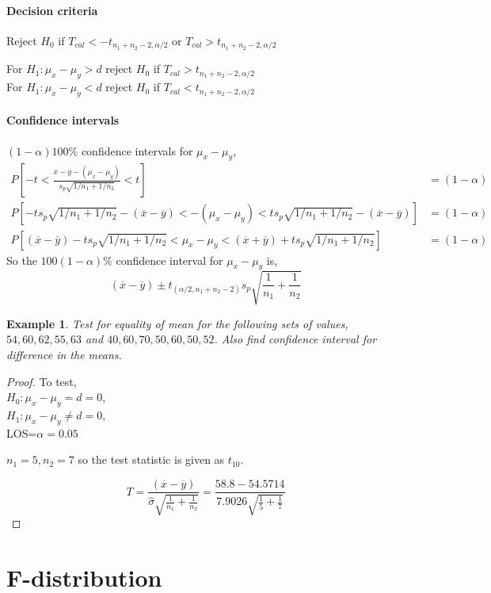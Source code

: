 \documentclass[oneside,11pt,pdftex]{book}%
\numberwithin{equation}{section}
\newtheorem{example}[theorem]{Example}
\numberwithin{section}{chapter}
\numberwithin{equation}{chapter}
\begin{document}
\subsubsection{Decision criteria}
Reject $ H_0 $ if $ T_{cal} < -t_{n_1+n_2-2,\alpha/2}$ or $ T_{cal}>t_{n_1+n_2-2,\alpha/2} $


For $ H_1: \mu_x-\mu_y>d $ reject $ H_0 $ if $ T_{cal} >t_{n_1+n_2-2,\alpha/2}$\\
For $ H_1: \mu_x-\mu_y<d $ reject $ H_0 $ if $ T_{cal} <t_{n_1+n_2-2,\alpha/2}$

\subsubsection{Confidence intervals}
$ (1-\alpha)100\% $ confidence intervals for $ \mu_x-\mu_y $,
\begin{align*}
	P\left[-t < \frac{\overline{x}-\overline{y}-(\mu_x-\mu_y)}{s_p \sqrt{1/n_1+1/n_2}}<t\right]&=(1-\alpha)\\
	P\left[-t s_p \sqrt{1/n_1+1/n_2}-(\overline{x}-\overline{y}) < -(\mu_x-\mu_y) < t s_p \sqrt{1/n_1+1/n_2}-(\overline{x}-\overline{y})\right]&=(1-\alpha)\\
	P\left[(\overline{x}-\overline{y})-t s_p \sqrt{1/n_1+1/n_2} < \mu_x-\mu_y < (\overline{x}+\overline{y})+t s_p \sqrt{1/n_1+1/n_2}\right]&=(1-\alpha)
\end{align*}
So the $ 100(1-\alpha)\% $ confidence interval for $ \mu_x-\mu_y  $ is,
\[ (\overline{x}-\overline{y})\pm t_{(\alpha/2, n_1+n_2-2)}s_p \sqrt{\frac{1}{n_1}+\frac{1}{n_2}} \]


\begin{example}
	Test for equality of mean for the following sets of values,
	$ 54, 60, 62, 55, 63 $ and $ 40, 60, 70, 50, 60, 50, 52 $. Also find confidence interval for difference in the means.
\end{example}
\begin{proof}
	To test,\\
	$ H_0:\mu_x-\mu_y=d=0$,\\
	$ H_1:\mu_x - \mu_y \neq d=0 $,\\
	LOS=$ \alpha=0.05 $
	
	
	$ n_1=5, n_2=7 $ so the test statistic is given as $ t_{10} $.
	
	\[ T=\frac{(\overline{x}-\overline{y})}{\hat{\sigma}\sqrt{\frac{1}{n_1}+\frac{1}{n_2}}} = \frac{58.8-54.5714}{7.9026 \sqrt{\frac{1}{5}+\frac{1}{7}}}\]
\end{proof}
\chapter{F-distribution}


\backmatter


\thispagestyle{empty}%
{\ }
\newpage
\end{document}
